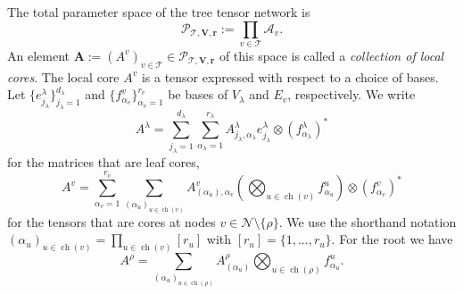 \documentclass[12pt]{article}
\theoremstyle{definition}
\numberwithin{theorem}{section}
\begin{document}
The total parameter space of the tree tensor network is
\begin{equation*}
        \mathcal P_{\mathscr T,\mathbf V,\mathbf r}
    :=
    \prod_{v\in\mathscr T}\mathcal A_v.
\end{equation*}
An element $\mathbf A:=(A^v)_{v\in\mathscr T}\in \mathcal P_{\mathscr T,\mathbf V,\mathbf r}$ of this space is called a \emph{collection of local cores}. The local core $A^v$ 
is a tensor expressed with respect to a choice of bases. Let $\{e^\lambda_{j_\lambda}\}_{j_\lambda=1}^{d_\lambda}$ and $\{f^v_{\alpha_v}\}_{\alpha_v=1}^{r_v}$ be bases of $V_\lambda$ and $E_v$, respectively.
We write
\begin{equation*}
        A^\lambda
    =
    \sum_{j_\lambda=1}^{d_\lambda}\sum_{\alpha_\lambda = 1}^{r_\lambda}
    A^\lambda_{j_\lambda,\alpha_\lambda}
    e^\lambda_{j_\lambda}\otimes(f^\lambda_{\alpha_\lambda})^*
\end{equation*}
for the matrices that are leaf cores,
\begin{equation*}
        A^v
    =
    \sum_{\alpha_v=1}^{r_v}\sum_{(\alpha_u)_{u\in\operatorname{ch}(v)}}
    A^v_{(\alpha_u),\alpha_v}
    \left(
    \bigotimes_{u\in\operatorname{ch}(v)}f^u_{\alpha_u}
    \right)
    \otimes(f^v_{\alpha_v})^*
\end{equation*}
for the tensors that are cores at nodes $v\in\mathscr N\setminus\{\rho\}$. We use the shorthand notation $(\alpha_u)_{u\in\operatorname{ch}(v)} = \prod_{u\in\operatorname{ch}(v)} [r_u]$ with $[r_u] = \{1, ..., r_u\}$. For the root we have
\begin{equation*}
        A^\rho
    =
    \sum_{(\alpha_u)_{u\in\operatorname{ch}(\rho)}}
    A^\rho_{(\alpha_u)}
    \bigotimes_{u\in\operatorname{ch}(\rho)}f^u_{\alpha_u}.
\end{equation*}
\end{document}
